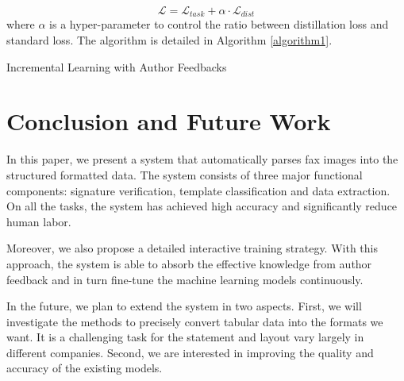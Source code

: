 \documentclass[sigconf]{acmart}
\begin{document}
\begin{equation}
\mathcal{L}=\mathcal{L}_{task} + \alpha\cdot\mathcal{L}_{dist}
\end{equation}
where $\alpha$ is a hyper-parameter to control the ratio between distillation loss and standard loss. The algorithm is detailed in Algorithm \ref{algorithm1}.


\begin{algorithm}[htb]
	\caption{Incremental Learning with Author Feedbacks}
	\label{algorithm1}
	\raggedright
	
\end{algorithm}

\section{Conclusion and Future Work}

In this paper, we present a system that automatically parses fax images into the structured formatted data. The system consists of three major functional components: signature verification, template classification and data extraction. On all the tasks, the system has achieved high accuracy and significantly reduce human labor.

Moreover, we also propose a detailed interactive training strategy. With this approach, the system is able to absorb the effective knowledge from author feedback and in turn fine-tune the machine learning models continuously.

In the future, we plan to extend the system in two aspects. First, we will investigate the methods to precisely convert tabular data into the formats we want. It is a challenging task for the statement and layout vary largely in different companies. Second, we are interested in improving the quality and accuracy of the existing models.




\end{document}
